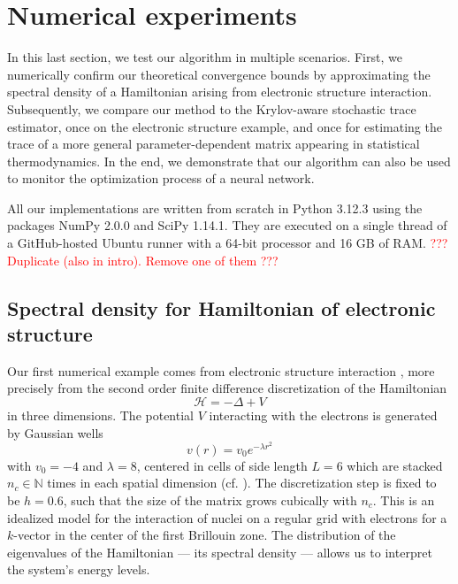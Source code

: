 
\section{Numerical experiments}
\label{sec:results}

\color{black}

In this last section, we test our algorithm in multiple scenarios. First, we numerically confirm our theoretical convergence bounds by approximating the spectral density of a Hamiltonian arising from electronic structure interaction. Subsequently, we compare our method to the Krylov-aware stochastic trace estimator, once on the electronic structure example, and once for estimating the trace of a more general parameter-dependent matrix appearing in statistical thermodynamics. In the end, we demonstrate that our algorithm can also be used to monitor the optimization process of a neural network.

All our implementations are written from scratch in Python 3.12.3 using the packages NumPy 2.0.0 and SciPy 1.14.1. They are executed on a single thread of a GitHub-hosted Ubuntu runner with a 64-bit processor and 16 GB of RAM. \textcolor{red}{??? Duplicate (also in intro). Remove one of them ??? }

\subsection{Spectral density for Hamiltonian of electronic structure}
\label{subsec:hamiltonian}

Our first numerical example comes from electronic structure interaction \cite{lin-2017-randomized-estimation}, more precisely from the second order finite difference discretization of the Hamiltonian
\begin{equation}
    \mathcal{H} = - \Delta + V
    \label{equ:5-experiments-electronic-hamiltonian}
\end{equation}
in three dimensions. The potential $V$ interacting with the electrons is generated by Gaussian wells
\begin{equation}
    v(r) = v_0 e^{-\lambda r^2}
    \label{equ:5-experiments-gaussian-cell}
\end{equation}
with $v_0 = -4$ and $\lambda = 8$, centered in cells of side length $L=6$ which are stacked $n_c \in \mathbb{N}$ times in each spatial dimension (cf. ). The discretization step is fixed to be $h=0.6$, such that the size of the matrix grows cubically with $n_c$. This is an idealized model for the interaction of nuclei on a regular grid with electrons for a $k$-vector in the center of the first Brillouin zone. The distribution of the eigenvalues of the Hamiltonian --- its spectral density --- allows us to interpret the system's energy levels.

